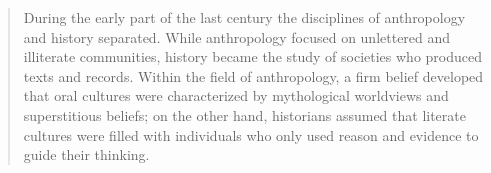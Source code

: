 \begin{quote}

During the early part of the last century the disciplines of anthropology and history separated. While anthropology focused on unlettered and illiterate communities, history became the study of societies who produced texts and records. Within the field of anthropology, a firm belief developed that oral cultures were characterized by mythological worldviews and superstitious beliefs; on the other hand, historians assumed that literate cultures were filled with individuals who only used reason and evidence to guide their thinking.
\end{quote}

